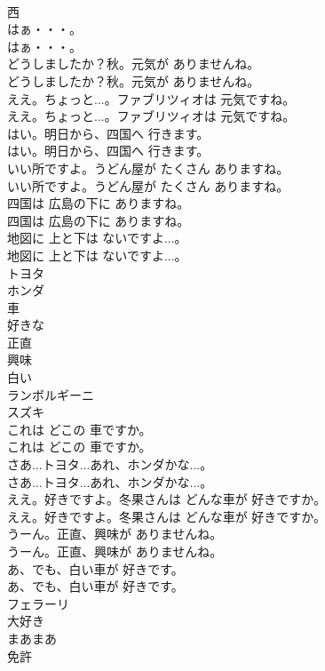 \documentclass[8pt]{extreport}
\begin{document}
\begin{CJK}{UTF8}{min}
\\	西
\\	はぁ・・・。	
\\	はぁ・・・。 
\\	どうしましたか？秋。元気が ありませんね。	
\\	どうしましたか？秋。元気が ありませんね。 
\\	ええ。ちょっと...。ファブリツィオは 元気ですね。	
\\	ええ。ちょっと...。ファブリツィオは 元気ですね。 
\\	はい。明日から、四国へ 行きます。	
\\	はい。明日から、四国へ 行きます。 
\\	いい所ですよ。うどん屋が たくさん ありますね。	
\\	いい所ですよ。うどん屋が たくさん ありますね。 
\\	四国は 広島の下に ありますね。	
\\	四国は 広島の下に ありますね。 
\\	地図に 上と下は ないですよ...。	
\\	地図に 上と下は ないですよ...。 
\\	トヨタ
\\	ホンダ
\\	車
\\	好きな
\\	正直
\\	興味
\\	白い
\\	ランボルギーニ
\\	スズキ
\\	これは どこの 車ですか。	
\\	これは どこの 車ですか。 
\\	さあ...トヨタ...あれ、ホンダかな...。	
\\	さあ...トヨタ...あれ、ホンダかな...。 
\\	ええ。好きですよ。冬果さんは どんな車が 好きですか。	
\\	ええ。好きですよ。冬果さんは どんな車が 好きですか。 
\\	うーん。正直、興味が ありませんね。	
\\	うーん。正直、興味が ありませんね。 
\\	あ、でも、白い車が 好きです。	
\\	あ、でも、白い車が 好きです。 
\\	フェラーリ
\\	大好き
\\	まあまあ
\\	免許

\end{CJK}
\end{document}
